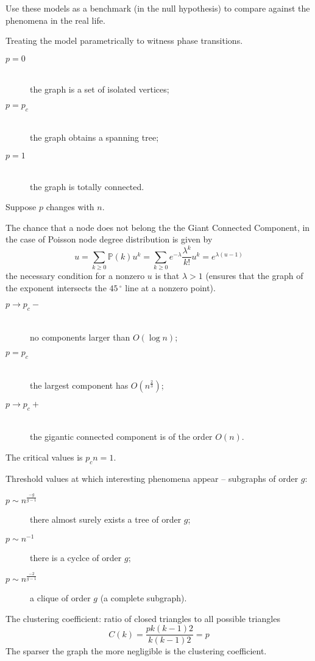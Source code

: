 \documentclass[a4paper]{article}
\newcommand{\pr}{\mathbb{P}}
\begin{document}
Use these models as a benchmark (in the null hypothesis) to compare against the phenomena in the real life.

Treating the model parametrically to witness phase transitions.
\begin{description}
	\item[$p=0$] \hfill \\ the graph is a set of isolated vertices;
	\item[$p=p_c$] \hfill \\ the graph obtains a spanning tree;
	\item[$p=1$] \hfill \\ the graph is totally connected.
\end{description}

Suppose $p$ changes with $n$. 


The chance that a node does not belong the the Giant Connected Component,
in the case of Poisson node degree distribution is given by
\[ u = \sum_{k\geq 0} \pr(k) u^k = \sum_{k\geq 0} e^{-\lambda}\frac{\lambda^k}{k!}u^k = e^{\lambda (u-1)}\]
the necessary condition for a nonzero $u$ is that $\lambda>1$
(ensures that the graph of the exponent intersects the $45\,^{\circ}$ line at a nonzero point).

\begin{description}
	\item[$p\to p_c-$] \hfill \\ no components larger than $O(\log n)$;
	\item[$p=p_c$] \hfill \\ the largest component has $O(n^\frac{2}{3})$;
	\item[$p\to p_c+$] \hfill \\ the gigantic connected component is of the order $O(n)$.
\end{description}
The critical values is $p_c n = 1$.

Threshold values at which interesting phenomena appear -- subgraphs of order $g$:
\begin{description}
	\item[$p\sim n^\frac{-g}{g-1}$] there almost surely exists a tree of order $g$;
	\item[$p\sim n^{-1}$] there is a cyclce of order $g$;
	\item[$p\sim n^\frac{-2}{g-1}$] a clique of order $g$ (a complete subgraph).
\end{description}


The clustering coefficient: ratio of closed triangles to all possible triangles
\[C(k) = \frac{p k(k-1) 2 }{ k( k-1 ) 2} = p\]
The sparser the graph the more negligible is the clustering coefficient.
\end{document}
